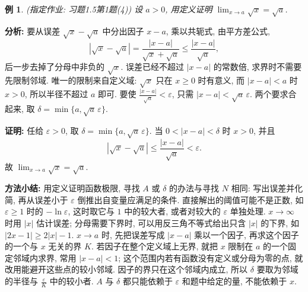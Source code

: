 \documentclass[UTF8,openany]{ctexbook}
\theoremstyle{chinesetextbook}
\newtheorem{example}{例}[section]
\newenvironment{cnproof}{\par\indent\textbf{证明:} \ignorespaces}{\par}
\begin{document}
\begin{example}
\textnormal{(指定作业: 习题1.5第1题(4))} 设 $a>0$, 用定义证明 $\displaystyle\lim_{x\to a}\sqrt x=\sqrt a$.
\end{example}
\par\indent\textbf{分析:} 要从误差 $\sqrt x-\sqrt a$ 中分出因子 $x-a$, 乘以共轭式, 由平方差公式,
\[
|\sqrt x-\sqrt a|=\frac{|x-a|}{\sqrt x+\sqrt a}\le\frac{|x-a|}{\sqrt a},
\]
后一步去掉了分母中非负的 $\sqrt x$. 误差已经不超过 $|x-a|$ 的常数倍, 求界时不需要先限制邻域. 唯一的限制来自定义域: $\sqrt x$ 只在 $x\ge0$ 时有意义, 而 $|x-a|<a$ 时 $x>0$, 所以半径不超过 $a$ 即可. 要使 $\displaystyle\frac{|x-a|}{\sqrt a}<\varepsilon$, 只需 $|x-a|<\sqrt a\,\varepsilon$. 两个要求合起来, 取 $\delta=\min\{a,\sqrt a\,\varepsilon\}$.
\begin{cnproof}
任给 $\varepsilon>0$, 取 $\delta=\min\{a,\sqrt a\,\varepsilon\}$. 当 $0<|x-a|<\delta$ 时 $x>0$, 并且
\[
|\sqrt x-\sqrt a|\le\frac{|x-a|}{\sqrt a}<\varepsilon.
\]
故 $\displaystyle\lim_{x\to a}\sqrt x=\sqrt a$.
\end{cnproof}
\par\indent\textbf{方法小结:} 用定义证明函数极限, 寻找 $A$ 或 $\delta$ 的办法与寻找 $N$ 相同: 写出误差并化简, 再从误差小于 $\varepsilon$ 倒推出自变量应满足的条件. 直接解出的阈值可能不是正数, 如 $\varepsilon\ge1$ 时的 $-\ln\varepsilon$, 这时取它与 $1$ 中的较大者, 或者对较大的 $\varepsilon$ 单独处理. $x\to\infty$ 时用 $|x|$ 估计误差; 分母需要下界时, 可以用反三角不等式给出只含 $|x|$ 的下界, 如 $|2x-1|\ge2|x|-1$. $x\to a$ 时, 先把误差写成 $|x-a|$ 乘以一个因子, 再求这个因子的一个与 $x$ 无关的界 $K$. 若因子在整个定义域上无界, 就把 $x$ 限制在 $a$ 的一个固定邻域内求界, 常用 $|x-a|<1$; 这个范围内若有函数没有定义或分母为零的点, 就改用能避开这些点的较小邻域. 因子的界只在这个邻域内成立, 所以 $\delta$ 要取为邻域的半径与 $\displaystyle\frac\varepsilon K$ 中的较小者. $A$ 与 $\delta$ 都只能依赖于 $\varepsilon$ 和题中给定的量, 不能依赖于 $x$.
\end{document}
